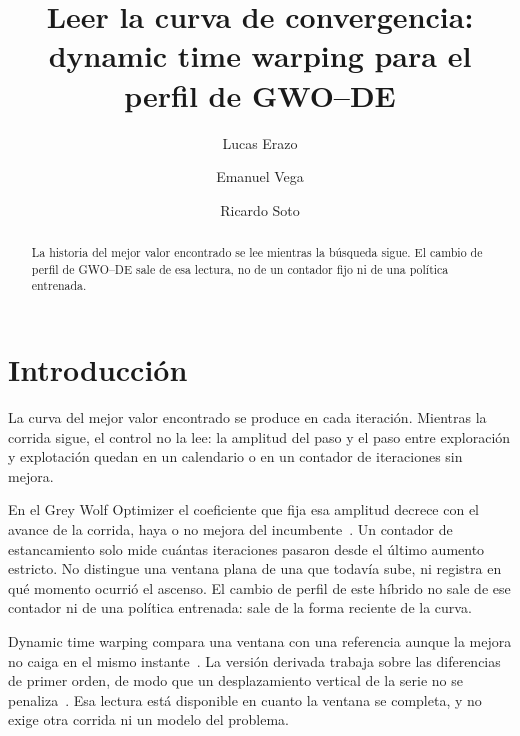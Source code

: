 \documentclass[runningheads]{llncs}
\begin{document}
\title{Leer la curva de convergencia: dynamic time warping para el perfil de GWO--DE}

\author{Lucas Erazo \and Emanuel Vega \and Ricardo Soto}


\maketitle

\begin{abstract}
La historia del mejor valor encontrado se lee mientras la búsqueda sigue.
El cambio de perfil de GWO--DE sale de esa lectura, no de un contador fijo ni de una política entrenada.
\end{abstract}

\section{Introducción}

La curva del mejor valor encontrado se produce en cada iteración. Mientras la corrida sigue, el control no la lee: la amplitud del paso y el paso entre exploración y explotación quedan en un calendario o en un contador de iteraciones sin mejora.

En el Grey Wolf Optimizer el coeficiente que fija esa amplitud decrece con el avance de la corrida, haya o no mejora del incumbente~\cite{mirjalili2014grey}. Un contador de estancamiento solo mide cuántas iteraciones pasaron desde el último aumento estricto. No distingue una ventana plana de una que todavía sube, ni registra en qué momento ocurrió el ascenso. El cambio de perfil de este híbrido no sale de ese contador ni de una política entrenada: sale de la forma reciente de la curva.

Dynamic time warping compara una ventana con una referencia aunque la mejora no caiga en el mismo instante~\cite{berndt1994using}. La versión derivada trabaja sobre las diferencias de primer orden, de modo que un desplazamiento vertical de la serie no se penaliza~\cite{keogh2001derivative}. Esa lectura está disponible en cuanto la ventana se completa, y no exige otra corrida ni un modelo del problema.
\end{document}
